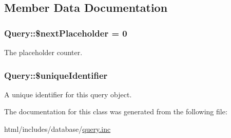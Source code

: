 \subsection{Member Data Documentation}
\hypertarget{classQuery_a971abbb28ad6cffc0b3260a1ca6e867a}{
\subsubsection[{\$nextPlaceholder}]{\setlength{\rightskip}{0pt plus 5cm}Query::\$nextPlaceholder = 0}}
\label{classQuery_a971abbb28ad6cffc0b3260a1ca6e867a}
The placeholder counter. \hypertarget{classQuery_a964c5e7a55b10b57bd10a5667abd2a3c}{
\subsubsection[{\$uniqueIdentifier}]{\setlength{\rightskip}{0pt plus 5cm}Query::\$uniqueIdentifier}}
\label{classQuery_a964c5e7a55b10b57bd10a5667abd2a3c}
A unique identifier for this query object. 

The documentation for this class was generated from the following file:\begin{DoxyCompactItemize}
\item 
html/includes/database/\hyperlink{query_8inc}{query.inc}\end{DoxyCompactItemize}
